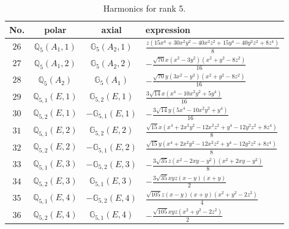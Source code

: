 \documentclass[fleqn,8pt,landscape]{jsarticle}
\begin{document}
\begin{table}[ht!]
\begin{center}
\caption{Harmonics for rank 5.}
\renewcommand{\arraystretch}{1.3}
\begin{tabular}{cccl} \hline \hline
No. & polar & axial & expression \\ \hline
$ 26 $ & $ \mathbb{Q}_{5}(A_{1},1) $ & $ \mathbb{G}_{5}(A_{2},1) $ & $ \frac{z \left(15 x^{4} + 30 x^{2} y^{2} - 40 x^{2} z^{2} + 15 y^{4} - 40 y^{2} z^{2} + 8 z^{4}\right)}{8} $ \\
$ 27 $ & $ \mathbb{Q}_{5}(A_{1},2) $ & $ \mathbb{G}_{5}(A_{2},2) $ & $ - \frac{\sqrt{70} x \left(x^{2} - 3 y^{2}\right) \left(x^{2} + y^{2} - 8 z^{2}\right)}{16} $ \\
$ 28 $ & $ \mathbb{Q}_{5}(A_{2}) $ & $ \mathbb{G}_{5}(A_{1}) $ & $ - \frac{\sqrt{70} y \left(3 x^{2} - y^{2}\right) \left(x^{2} + y^{2} - 8 z^{2}\right)}{16} $ \\
$ 29 $ & $ \mathbb{Q}_{5,1}(E,1) $ & $ \mathbb{G}_{5,2}(E,1) $ & $ \frac{3 \sqrt{14} x \left(x^{4} - 10 x^{2} y^{2} + 5 y^{4}\right)}{16} $ \\
$ 30 $ & $ \mathbb{Q}_{5,2}(E,1) $ & $ -\mathbb{G}_{5,1}(E,1) $ & $ - \frac{3 \sqrt{14} y \left(5 x^{4} - 10 x^{2} y^{2} + y^{4}\right)}{16} $ \\
$ 31 $ & $ \mathbb{Q}_{5,1}(E,2) $ & $ \mathbb{G}_{5,2}(E,2) $ & $ \frac{\sqrt{15} x \left(x^{4} + 2 x^{2} y^{2} - 12 x^{2} z^{2} + y^{4} - 12 y^{2} z^{2} + 8 z^{4}\right)}{8} $ \\
$ 32 $ & $ \mathbb{Q}_{5,2}(E,2) $ & $ -\mathbb{G}_{5,1}(E,2) $ & $ \frac{\sqrt{15} y \left(x^{4} + 2 x^{2} y^{2} - 12 x^{2} z^{2} + y^{4} - 12 y^{2} z^{2} + 8 z^{4}\right)}{8} $ \\
$ 33 $ & $ \mathbb{Q}_{5,1}(E,3) $ & $ -\mathbb{G}_{5,2}(E,3) $ & $ - \frac{3 \sqrt{35} z \left(x^{2} - 2 x y - y^{2}\right) \left(x^{2} + 2 x y - y^{2}\right)}{8} $ \\
$ 34 $ & $ \mathbb{Q}_{5,2}(E,3) $ & $ \mathbb{G}_{5,1}(E,3) $ & $ - \frac{3 \sqrt{35} x y z \left(x - y\right) \left(x + y\right)}{2} $ \\
$ 35 $ & $ \mathbb{Q}_{5,1}(E,4) $ & $ -\mathbb{G}_{5,2}(E,4) $ & $ \frac{\sqrt{105} z \left(x - y\right) \left(x + y\right) \left(x^{2} + y^{2} - 2 z^{2}\right)}{4} $ \\
$ 36 $ & $ \mathbb{Q}_{5,2}(E,4) $ & $ \mathbb{G}_{5,1}(E,4) $ & $ - \frac{\sqrt{105} x y z \left(x^{2} + y^{2} - 2 z^{2}\right)}{2} $ \\
 \hline \hline
\end{tabular}
\end{center}
\end{table}
\end{document}
